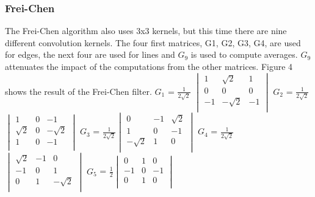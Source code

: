 \documentclass[12pt]{article}
\begin{document}
\subsubsection{Frei-Chen}
 The Frei-Chen algorithm also uses 3x3 kernels, but this time there are nine different convolution kernels. The four first matrices, G1, G2, G3, G4, are used for edges, the next four are used for lines and $G_9$ is used to compute averages. $G_9$ attenuates the impact of the computations from the other matrices. Figure 4 shows the result of the Frei-Chen filter.
\newline
\newline
 $G_1$ = $\frac{1}{2\sqrt2}$ $\begin{vmatrix}
        1 & \sqrt2 & 1\\
        0 & 0 & 0\\
        -1 & -\sqrt2 & -1\\
\end{vmatrix}$\hspace{5mm}
$G_2$ = $\frac{1}{2\sqrt2}$$\begin{vmatrix}
        1 & 0 & -1\\
        \sqrt2 & 0 & -\sqrt2\\
        1 & 0 & -1\\
\end{vmatrix}$\hspace{5mm}
$G_3$ = $\frac{1}{2\sqrt2}$$\begin{vmatrix}
        0 & -1 & \sqrt2\\
        1 & 0 & -1\\
        -\sqrt2 & 1 & 0\\
\end{vmatrix}$\hspace{5mm}
\newline
$G_4$ = $\frac{1}{2\sqrt2}$$\begin{vmatrix}
        \sqrt2 & -1 & 0\\
        -1 & 0 & 1\\
        0 & 1 & -\sqrt2\\
\end{vmatrix}$\hspace{5mm}
$G_5$ = $\frac{1}{2}$$\begin{vmatrix}
        0 & 1 & 0\\
        -1 & 0 & -1\\
        0 & 1 & 0\\
\end{vmatrix}$\hspace{10mm}
\end{document}

